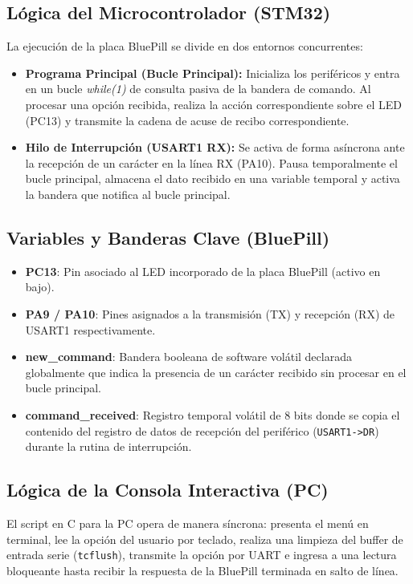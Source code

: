 \documentclass{plantilla}
\begin{document}
\subsection{Lógica del Microcontrolador (STM32)}
La ejecución de la placa BluePill se divide en dos entornos concurrentes:
\begin{itemize}
    \item \textbf{Programa Principal (Bucle Principal):} Inicializa los periféricos y entra en un bucle \textit{while(1)} de consulta pasiva de la bandera de comando. Al procesar una opción recibida, realiza la acción correspondiente sobre el LED (PC13) y transmite la cadena de acuse de recibo correspondiente.
    \item \textbf{Hilo de Interrupción (USART1 RX):} Se activa de forma asíncrona ante la recepción de un carácter en la línea RX (PA10). Pausa temporalmente el bucle principal, almacena el dato recibido en una variable temporal y activa la bandera que notifica al bucle principal.
\end{itemize}

\subsection{Variables y Banderas Clave (BluePill)}
\begin{itemize}
    \item \textbf{PC13}: Pin asociado al LED incorporado de la placa BluePill (activo en bajo).
    \item \textbf{PA9 / PA10}: Pines asignados a la transmisión (TX) y recepción (RX) de USART1 respectivamente.
    \item \textbf{new\_command}: Bandera booleana de software volátil declarada globalmente que indica la presencia de un carácter recibido sin procesar en el bucle principal.
    \item \textbf{command\_received}: Registro temporal volátil de 8 bits donde se copia el contenido del registro de datos de recepción del periférico (\texttt{USART1-\textgreater{}DR}) durante la rutina de interrupción.
\end{itemize}

\subsection{Lógica de la Consola Interactiva (PC)}
El script en C para la PC opera de manera síncrona: presenta el menú en terminal, lee la opción del usuario por teclado, realiza una limpieza del buffer de entrada serie (\texttt{tcflush}), transmite la opción por UART e ingresa a una lectura bloqueante hasta recibir la respuesta de la BluePill terminada en salto de línea.
\end{document}
